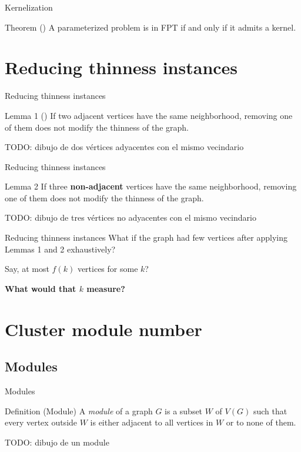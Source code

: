 \documentclass{beamer}
\begin{document}
\begin{frame}{Kernelization}
    \begin{block}{Theorem (\cite{parameterized-algorithms})}
        A parameterized problem is in FPT if and only if it admits a kernel.
    \end{block}
\end{frame}

\section{Reducing thinness instances}
\begin{frame}{Reducing thinness instances}
    \begin{block}{Lemma 1 (\cite{thinness-of-product-graphs})}
        If two adjacent vertices have the same neighborhood, removing one of them does not modify the thinness of the graph.
    \end{block}

    TODO: dibujo de dos vértices adyacentes con el mismo vecindario
\end{frame}

\begin{frame}{Reducing thinness instances}
    \begin{block}{Lemma 2}
        If three \textbf{non-adjacent} vertices have the same neighborhood, removing one of them does not modify the thinness of the graph.
    \end{block}

    TODO: dibujo de tres vértices no adyacentes con el mismo vecindario
\end{frame}

\begin{frame}{Reducing thinness instances}
    What if the graph had few vertices after applying Lemmas 1 and 2 exhaustively? 

    \vspace{1em}
    \pause
    Say, at most $f(k)$ vertices for some $k$?

    \vspace{1em}
    \pause
    \textbf{What would that $k$ measure?}
\end{frame}

\section{Cluster module number}
\subsection{Modules}
\begin{frame}{Modules}
    \begin{block}{Definition (Module)}
        A \emph{module} of a graph $G$ is a subset $W$ of $V(G)$ such that every vertex outside $W$ is either adjacent to all vertices in $W$ or to none of them.
    \end{block}

    TODO: dibujo de un module
\end{frame}
\end{document}

